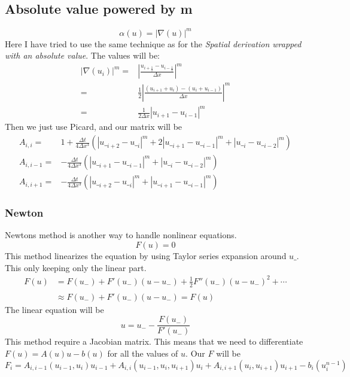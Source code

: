 \documentclass[norsk,11pt,a4paper]{article}
\begin{document}
\subsection*{Absolute value powered by m}
\begin{equation}
	\alpha(u) = |\nabla(u)|^m
\end{equation}
Here I have tried to use the same technique as for the \emph{Spatial derivation wrapped with an absolute value}.
The values will be:
\begin{align*}
|\nabla(u_i)|^m=&\left|\frac{u_{i+\frac{1}{2}}-u_{i-\frac{1}{2}}}{\Delta x}\right|^m\\
=&\frac{1}{2}\left|\frac{(u_{i+1}+u_i)-(u_i+u_{i-1})}{\Delta x}\right|^m\\
=&\frac{1}{2\Delta x}\left|u_{i+1}-u_{i-1}\right|^m
\end{align*}
Then we just use Picard, and our matrix will be
\begin{align*} 
A_{i,i} =& 1+\frac{\Delta t}{4\Delta x^3}(|u\__{i+2}-u\__i|^m+2|u\__{i+1}-u\__{i-1}|^m+|u\__{i}-u\__{i-2}|^m)\\
A_{i,i-1} =&-\frac{\Delta t}{4\Delta x^3}(|u\__{i+1}-u\__{i-1}|^m+|u\__{i}-u\__{i-2}|^m)\\
A_{i,i+1} =&-\frac{\Delta t}{4\Delta x^3}(|u\__{i+2}-u\__i|^m+|u\__{i+1}-u\__{i-1}|^m)
\end{align*}                               
\subsubsection*{Newton}
Newtons method is another way to handle nonlinear equations. 
\begin{equation}
	F(u) = 0
\end{equation}
This method linearizes the equation by using Taylor series expansion around
$u\_$. This only keeping only the linear part.
\begin{align*}
	F(u) &= F(u_{-}) + F'(u_{-})(u - u_{-}) + \frac{1}{2}F''(u_{-})(u-u_{-})^2
	+\cdots  \\
	& \approx F(u_{-}) + F'(u_{-})(u - u_{-}) = \hat F(u)
\end{align*}
The linear equation will be
\begin{equation}
	u = u_{-} - \frac{F(u_{-})}{F'(u_{-})}
\end{equation}
This method require a Jacobian matrix. This means that we need to differentiate $F(u) = A(u)u - b(u)$ for all the 
values of $u$. Our $F$ will be
\begin{equation*}
F_i = A_{i,i-1}(u_{i-1},u_i)u_{i-1}+A_{i,i}(u_{i-1},u_{i},u_{i+1})u_{i}+A_{i,i+1}(u_i,u_{i+1})u_{i+1}-b_i(u^{n-1}_i)
\end{equation*}
\end{document}
